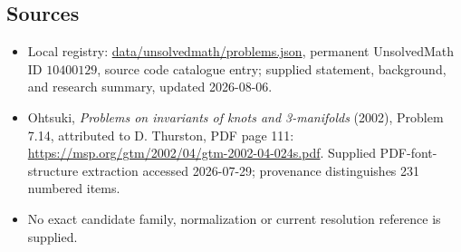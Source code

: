 \documentclass[11pt]{article}
\begin{document}
\subsection{Sources}
\begin{itemize}
\item Local registry: \url{data/unsolvedmath/problems.json}, permanent UnsolvedMath ID \(10400129\), source code catalogue entry; supplied statement, background, and research summary, updated 2026-08-06.
\item Ohtsuki, \emph{Problems on invariants of knots and 3-manifolds} (2002), Problem 7.14, attributed to D. Thurston, PDF page 111: \url{https://msp.org/gtm/2002/04/gtm-2002-04-024s.pdf}. Supplied PDF-font-structure extraction accessed 2026-07-29; provenance distinguishes 231 numbered items.
\item No exact candidate family, normalization or current resolution reference is supplied.
\end{itemize}
\end{document}
